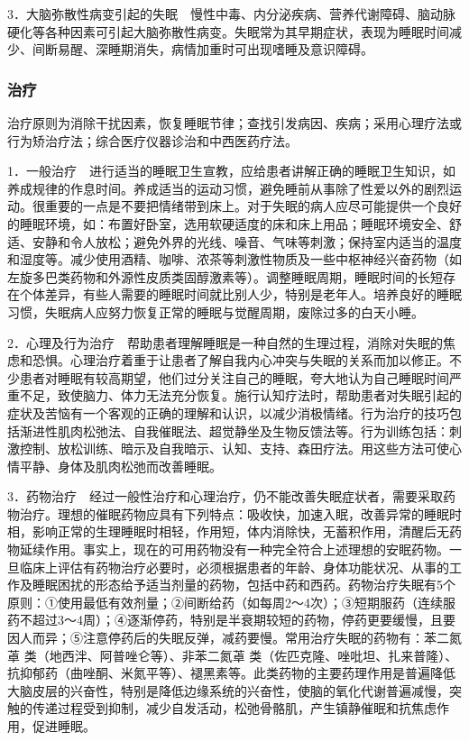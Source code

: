 3．大脑弥散性病变引起的失眠　慢性中毒、内分泌疾病、营养代谢障碍、脑动脉硬化等各种因素可引起大脑弥散性病变。失眠常为其早期症状，表现为睡眠时间减少、间断易醒、深睡期消失，病情加重时可出现嗜睡及意识障碍。

\subsubsection{治疗}

治疗原则为消除干扰因素，恢复睡眠节律；查找引发病因、疾病；采用心理疗法或行为矫治疗法；综合医疗仪器诊治和中西医药疗法。

1．一般治疗　进行适当的睡眠卫生宣教，应给患者讲解正确的睡眠卫生知识，如养成规律的作息时间。养成适当的运动习惯，避免睡前从事除了性爱以外的剧烈运动。很重要的一点是不要把情绪带到床上。对于失眠的病人应尽可能提供一个良好的睡眠环境，如：布置好卧室，选用软硬适度的床和床上用品；睡眠环境安全、舒适、安静和令人放松；避免外界的光线、噪音、气味等刺激；保持室内适当的温度和湿度等。减少使用酒精、咖啡、浓茶等刺激性物质及一些中枢神经兴奋药物（如左旋多巴类药物和外源性皮质类固醇激素等）。调整睡眠周期，睡眠时间的长短存在个体差异，有些人需要的睡眠时间就比别人少，特别是老年人。培养良好的睡眠习惯，失眠病人应努力恢复正常的睡眠与觉醒周期，废除过多的白天小睡。

2．心理及行为治疗　帮助患者理解睡眠是一种自然的生理过程，消除对失眠的焦虑和恐惧。心理治疗着重于让患者了解自我内心冲突与失眠的关系而加以修正。不少患者对睡眠有较高期望，他们过分关注自己的睡眠，夸大地认为自己睡眠时间严重不足，致使脑力、体力无法充分恢复。施行认知疗法时，帮助患者对失眠引起的症状及苦恼有一个客观的正确的理解和认识，以减少消极情绪。行为治疗的技巧包括渐进性肌肉松弛法、自我催眠法、超觉静坐及生物反馈法等。行为训练包括：刺激控制、放松训练、暗示及自我暗示、认知、支持、森田疗法。用这些方法可使心情平静、身体及肌肉松弛而改善睡眠。

3．药物治疗　经过一般性治疗和心理治疗，仍不能改善失眠症状者，需要采取药物治疗。理想的催眠药物应具有下列特点：吸收快，加速入眠，改善异常的睡眠时相，影响正常的生理睡眠时相轻，作用短，体内消除快，无蓄积作用，清醒后无药物延续作用。事实上，现在的可用药物没有一种完全符合上述理想的安眠药物。一旦临床上评估有药物治疗必要时，必须根据患者的年龄、身体功能状况、从事的工作及睡眠困扰的形态给予适当剂量的药物，包括中药和西药。药物治疗失眠有5个原则：①使用最低有效剂量；②间断给药（如每周2～4次）；③短期服药（连续服药不超过3～4周）；④逐渐停药，特别是半衰期较短的药物，停药更要缓慢，且要因人而异；⑤注意停药后的失眠反弹，减药要慢。常用治疗失眠的药物有：苯二氮䓬
类（地西泮、阿普唑仑等）、非苯二氮䓬
类（佐匹克隆、唑吡坦、扎来普隆）、抗抑郁药（曲唑酮、米氮平等）、褪黑素等。此类药物的主要药理作用是普遍降低大脑皮层的兴奋性，特别是降低边缘系统的兴奋性，使脑的氧化代谢普遍减慢，突触的传递过程受到抑制，减少自发活动，松弛骨骼肌，产生镇静催眠和抗焦虑作用，促进睡眠。

